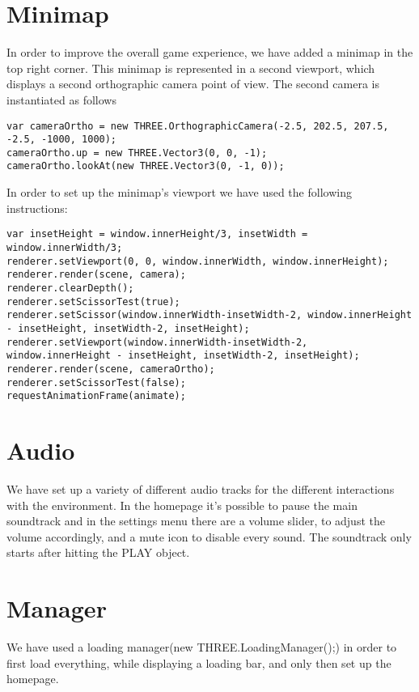 \documentclass[a4paper,oneside]{report}
\begin{document}
\section{Minimap}
In order to improve the overall game experience, we have added a minimap in the top right corner. This minimap is represented in a second viewport, which displays a second orthographic camera point of view. The second camera is instantiated as follows
\begin{lstlisting}
var cameraOrtho = new THREE.OrthographicCamera(-2.5, 202.5, 207.5, -2.5, -1000, 1000);
cameraOrtho.up = new THREE.Vector3(0, 0, -1);
cameraOrtho.lookAt(new THREE.Vector3(0, -1, 0));
\end{lstlisting}
In order to set up the minimap's viewport we have used the following instructions:
\begin{lstlisting}
var insetHeight = window.innerHeight/3, insetWidth = window.innerWidth/3;
renderer.setViewport(0, 0, window.innerWidth, window.innerHeight);
renderer.render(scene, camera);
renderer.clearDepth();
renderer.setScissorTest(true);
renderer.setScissor(window.innerWidth-insetWidth-2, window.innerHeight - insetHeight, insetWidth-2, insetHeight);
renderer.setViewport(window.innerWidth-insetWidth-2, window.innerHeight - insetHeight, insetWidth-2, insetHeight);
renderer.render(scene, cameraOrtho);
renderer.setScissorTest(false);
requestAnimationFrame(animate);
\end{lstlisting}

\section{Audio}
We have set up a variety of different audio tracks for the different interactions with the environment.
In the homepage it's possible to pause the main soundtrack and in the settings menu there are a volume slider, to adjust the volume accordingly, and a mute icon to disable every sound. The soundtrack only starts after hitting the PLAY object.

\section{Manager}
We have used a loading manager(new THREE.LoadingManager();) in order to first load everything, while displaying a loading bar, and only then set up the homepage.
\end{document}
